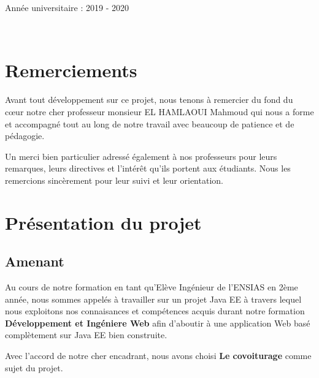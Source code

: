 \documentclass[a4paper]{report}
\begin{document}
\begin{spacing}{2}
\begin{titlepage}
\begin{center}
\vfill

{\large Année universitaire : 2019 - 2020}

\end{center}
\end{titlepage}

\newpage
\thispagestyle{empty}
~
\newpage
\thispagestyle{empty}
\tableofcontents
\thispagestyle{empty}
\listoffigures
\thispagestyle{empty}
\setcounter{page}{0}

\newpage

\renewcommand{\arraystretch}{1}







\chapter*{Remerciements}

Avant tout développement sur ce projet, nous tenons à remercier du fond du cœur notre cher professeur monsieur EL HAMLAOUI Mahmoud qui nous a forme et accompagné  tout au long de notre travail avec beaucoup de patience et de pédagogie.

Un merci bien particulier adressé également à nos professeurs pour leurs remarques, leurs directives et l'intérêt qu'ils portent aux étudiants. Nous les remercions sincèrement pour leur suivi et leur orientation.


\chapter{Présentation du projet}
\section{Amenant}

\par 
Au cours de notre formation en tant qu'Elève Ingénieur de l'ENSIAS en 2ème année, nous sommes appelés à travailler sur un projet Java EE à travers lequel nous exploitons nos connaisances et compétences acquis durant notre formation \textbf{Développement et Ingéniere Web} afin d'aboutir à une application Web basé complètement sur Java EE bien construite. 

Avec l'accord de notre cher encadrant, nous avons choisi \textbf{Le covoiturage} comme sujet du projet. 


\end{spacing}
\end{document}
